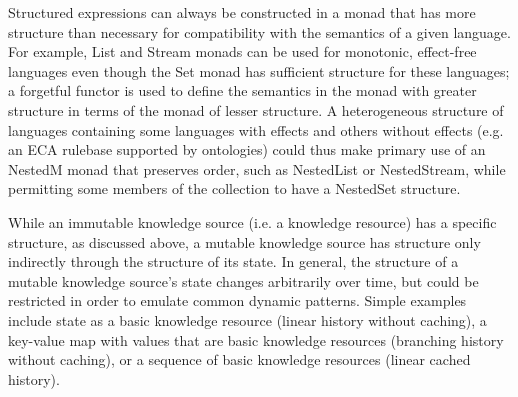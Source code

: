 \documentclass[runningheads]{llncs}
\begin{document}
Structured expressions can always be constructed in a monad that has more structure than necessary for compatibility with the semantics of a given language.
For example, List and Stream monads can be used for monotonic, effect-free languages even though the Set monad has sufficient structure for these languages;
a forgetful functor is used to define the semantics in the monad with greater structure in terms of the monad of lesser structure.
A heterogeneous structure of languages containing some languages with effects and others without effects (e.g. an ECA rulebase supported by ontologies) could thus make primary use of an NestedM monad that preserves order, such as NestedList or NestedStream, while permitting some members of the collection to have a NestedSet structure. 


While an immutable knowledge source (i.e. a knowledge resource) has a specific structure, as discussed above, a mutable knowledge source has structure only indirectly through the structure of its state. In general, the structure of a mutable knowledge source's state changes arbitrarily over time, but could be restricted in order to emulate common dynamic patterns. Simple examples include state as a basic knowledge resource (linear history without caching), a key-value map with values that are basic knowledge resources (branching history without caching), or a sequence of basic knowledge resources (linear cached history). 
\end{document}
